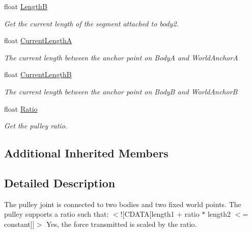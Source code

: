 \begin{DoxyCompactItemize}
float \hyperlink{class_farseer_physics_1_1_dynamics_1_1_joints_1_1_pulley_joint_a58357c7837c4a0bf66fd971902be9cd7}{Length\+B}
\begin{DoxyCompactList}\small\item\em Get the current length of the segment attached to body2. \end{DoxyCompactList}\item 
float \hyperlink{class_farseer_physics_1_1_dynamics_1_1_joints_1_1_pulley_joint_a42a77c5661b363600fa0eeb553c1abc9}{Current\+Length\+A}
\begin{DoxyCompactList}\small\item\em The current length between the anchor point on Body\+A and World\+Anchor\+A \end{DoxyCompactList}\item 
float \hyperlink{class_farseer_physics_1_1_dynamics_1_1_joints_1_1_pulley_joint_ad710876f9f9f55ca5a130d79f75feb33}{Current\+Length\+B}
\begin{DoxyCompactList}\small\item\em The current length between the anchor point on Body\+B and World\+Anchor\+B \end{DoxyCompactList}\item 
float \hyperlink{class_farseer_physics_1_1_dynamics_1_1_joints_1_1_pulley_joint_a6bf66b70cf50c30c23ada2d790c07f5b}{Ratio}
\begin{DoxyCompactList}\small\item\em Get the pulley ratio. \end{DoxyCompactList}\end{DoxyCompactItemize}
\subsection*{Additional Inherited Members}


\subsection{Detailed Description}
The pulley joint is connected to two bodies and two fixed world points. The pulley supports a ratio such that\+: $<$!\mbox{[}C\+D\+A\+T\+A\mbox{[}length1 + ratio $\ast$ length2 $<$= constant\mbox{]}\mbox{]}$>$ Yes, the force transmitted is scaled by the ratio. 

